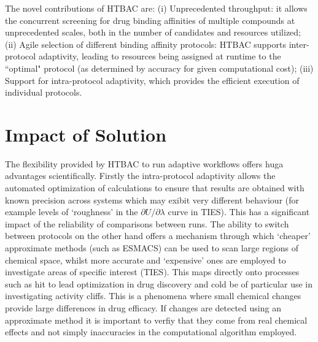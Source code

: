 \documentclass[conference]{IEEEtran}
\begin{document}
The novel contributions of HTBAC are: (i) Unprecedented throughput: it allows
the concurrent screening for drug binding affinities of multiple compounds at
unprecedented scales, both in the number of candidates and resources utilized;
(ii) Agile selection of different binding affinity protocols: HTBAC supports
inter-protocol adaptivity, leading to resources being assigned at runtime to
the ``optimal" protocol (as determined by accuracy for given computational
cost); (iii) Support for intra-protocol adaptivity, which provides the
efficient execution of individual protocols. 




       
\section{Impact of Solution}\label{sec:impact}


The flexibility provided by HTBAC to run adaptive workflows offers huga advantages scientifically. 
Firstly the intra-protocol adaptivity allows the automated optimization of calculations to ensure that 
results are obtained with known precision across systems which may exibit very different behaviour (for example levels of `roughness' in the $\partial U/\partial\lambda$ curve in TIES).
This has a significant impact of the reliability of comparisons between runs. 
The ability to switch between protocols on the other hand offers a mechanism through which `cheaper' approximate methods (such as ESMACS) can be used to scan large regions of chemical space, whilst more accurate and `expensive' ones are employed to investigate areas of specific interest (TIES).
This maps directly onto processes such as hit to lead optimization in drug discovery and cold be of particular use in investigating activity cliffs. 
This is a phenomena where small chemical changes provide large differences in drug efficacy.
If changes are detected using an approximate method it is important to verfiy that they come from 
real chemical effects and not simply inaccuracies in the computational algorithm employed.
\end{document}
